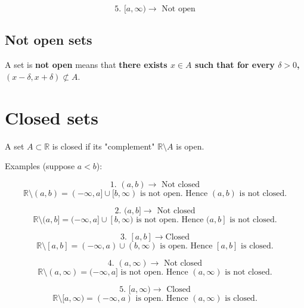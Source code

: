 \documentclass[11pt]{article}
\begin{document}
\[\text{5. } [a, \infty) \rightarrow \text{ Not open}\]

\begin{center}
\end{center}


\subsection{Not open sets}
\label{sec:orga4c66bc}
A set is \textbf{not open} means that \textbf{there exists \(x \in A\) such that for every \(\delta > 0\), \((x - \delta, x + \delta) \not\subset A\)}.




\section{Closed sets}
\label{sec:org940d7e0}
A set \(A \subset \mathbb{R}\) is closed if its "complement" \(\mathbb{R} \setminus A\) is open.

\newpage

Examples (suppose \(a < b\)):

\[\text{1. } (a, b) \rightarrow \text{ Not closed}\]
\[\mathbb{R} \setminus (a, b) = (-\infty, a] \cup [b, \infty) \text{ is not open. Hence } (a, b) \text{ is not closed.}\]

\[\text{2. } (a, b] \rightarrow \text{ Not closed}\]
\[\mathbb{R} \setminus (a, b] = (-\infty, a] \cup [b, \infty) \text{ is not open. Hence } (a, b] \text{ is not closed.}\]

\[\text{3. } [a, b] \rightarrow \text{Closed}\]
\[\mathbb{R} \setminus [a, b] = (-\infty, a) \cup (b, \infty) \text{ is open. Hence } [a, b] \text{ is closed.}\]

\[\text{4. } (a, \infty) \rightarrow \text{ Not closed}\]
\[\mathbb{R} \setminus (a, \infty) = (-\infty, a] \text{ is not open. Hence } (a, \infty) \text{ is not closed.}\]

\[\text{5. } [a, \infty) \rightarrow \text{ Closed}\]
\[\mathbb{R} \setminus [a, \infty) = (-\infty, a) \text{ is open. Hence } (a, \infty) \text{ is closed.}\]
\end{document}
